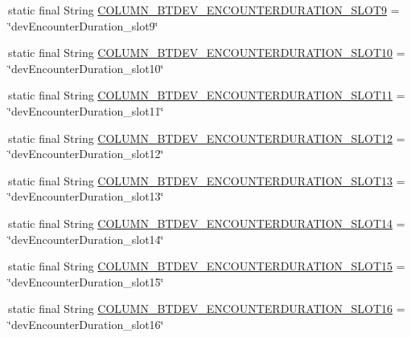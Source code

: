 \begin{DoxyCompactItemize}
\item 
static final String \hyperlink{classcom_1_1copelabs_1_1oiframework_1_1socialproximity_1_1_s_q_lite_helper_aa83e807bb41ffcbe2d4def924ab1e348}{C\+O\+L\+U\+M\+N\+\_\+\+B\+T\+D\+E\+V\+\_\+\+E\+N\+C\+O\+U\+N\+T\+E\+R\+D\+U\+R\+A\+T\+I\+O\+N\+\_\+\+S\+L\+O\+T9} = \char`\"{}dev\+Encounter\+Duration\+\_\+slot9\char`\"{}
\item 
static final String \hyperlink{classcom_1_1copelabs_1_1oiframework_1_1socialproximity_1_1_s_q_lite_helper_a44cdf46d6a1763bf54a61c202188312d}{C\+O\+L\+U\+M\+N\+\_\+\+B\+T\+D\+E\+V\+\_\+\+E\+N\+C\+O\+U\+N\+T\+E\+R\+D\+U\+R\+A\+T\+I\+O\+N\+\_\+\+S\+L\+O\+T10} = \char`\"{}dev\+Encounter\+Duration\+\_\+slot10\char`\"{}
\item 
static final String \hyperlink{classcom_1_1copelabs_1_1oiframework_1_1socialproximity_1_1_s_q_lite_helper_add0e848d049869ca8b058fd6f8465f63}{C\+O\+L\+U\+M\+N\+\_\+\+B\+T\+D\+E\+V\+\_\+\+E\+N\+C\+O\+U\+N\+T\+E\+R\+D\+U\+R\+A\+T\+I\+O\+N\+\_\+\+S\+L\+O\+T11} = \char`\"{}dev\+Encounter\+Duration\+\_\+slot11\char`\"{}
\item 
static final String \hyperlink{classcom_1_1copelabs_1_1oiframework_1_1socialproximity_1_1_s_q_lite_helper_a6fc6ec1c8e4a832378c2481ef7510642}{C\+O\+L\+U\+M\+N\+\_\+\+B\+T\+D\+E\+V\+\_\+\+E\+N\+C\+O\+U\+N\+T\+E\+R\+D\+U\+R\+A\+T\+I\+O\+N\+\_\+\+S\+L\+O\+T12} = \char`\"{}dev\+Encounter\+Duration\+\_\+slot12\char`\"{}
\item 
static final String \hyperlink{classcom_1_1copelabs_1_1oiframework_1_1socialproximity_1_1_s_q_lite_helper_ae870950e44e1f97bfb360d1619b75796}{C\+O\+L\+U\+M\+N\+\_\+\+B\+T\+D\+E\+V\+\_\+\+E\+N\+C\+O\+U\+N\+T\+E\+R\+D\+U\+R\+A\+T\+I\+O\+N\+\_\+\+S\+L\+O\+T13} = \char`\"{}dev\+Encounter\+Duration\+\_\+slot13\char`\"{}
\item 
static final String \hyperlink{classcom_1_1copelabs_1_1oiframework_1_1socialproximity_1_1_s_q_lite_helper_a4b653e54a4fe2c7a5b446abbed929aa3}{C\+O\+L\+U\+M\+N\+\_\+\+B\+T\+D\+E\+V\+\_\+\+E\+N\+C\+O\+U\+N\+T\+E\+R\+D\+U\+R\+A\+T\+I\+O\+N\+\_\+\+S\+L\+O\+T14} = \char`\"{}dev\+Encounter\+Duration\+\_\+slot14\char`\"{}
\item 
static final String \hyperlink{classcom_1_1copelabs_1_1oiframework_1_1socialproximity_1_1_s_q_lite_helper_af8916712e22421bfb27c17934dc19bf6}{C\+O\+L\+U\+M\+N\+\_\+\+B\+T\+D\+E\+V\+\_\+\+E\+N\+C\+O\+U\+N\+T\+E\+R\+D\+U\+R\+A\+T\+I\+O\+N\+\_\+\+S\+L\+O\+T15} = \char`\"{}dev\+Encounter\+Duration\+\_\+slot15\char`\"{}
\item 
static final String \hyperlink{classcom_1_1copelabs_1_1oiframework_1_1socialproximity_1_1_s_q_lite_helper_a4ef85302cf258bdda8ab288488a27614}{C\+O\+L\+U\+M\+N\+\_\+\+B\+T\+D\+E\+V\+\_\+\+E\+N\+C\+O\+U\+N\+T\+E\+R\+D\+U\+R\+A\+T\+I\+O\+N\+\_\+\+S\+L\+O\+T16} = \char`\"{}dev\+Encounter\+Duration\+\_\+slot16\char`\"{}

\end{DoxyCompactItemize}
